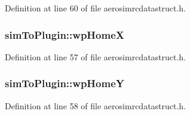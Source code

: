 Definition at line 60 of file aerosimrcdatastruct.\-h.

\hypertarget{group___aero_sim_r_c_gac7fe47d860d72f33b075d84a1794f039}{
\subsubsection[{wp\-Home\-X}]{ sim\-To\-Plugin\-::wp\-Home\-X}}\label{group___aero_sim_r_c_gac7fe47d860d72f33b075d84a1794f039}


Definition at line 57 of file aerosimrcdatastruct.\-h.

\hypertarget{group___aero_sim_r_c_ga943c9583ab5e36a5c4b4eb92b34c3aa2}{
\subsubsection[{wp\-Home\-Y}]{ sim\-To\-Plugin\-::wp\-Home\-Y}}\label{group___aero_sim_r_c_ga943c9583ab5e36a5c4b4eb92b34c3aa2}


Definition at line 58 of file aerosimrcdatastruct.\-h.

